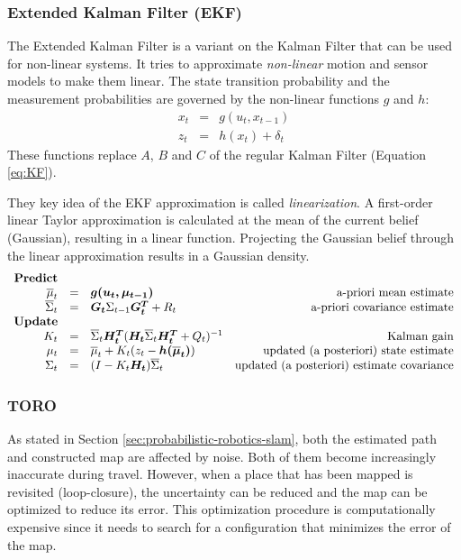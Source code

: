 \subsubsection{Extended Kalman Filter (EKF)}
\label{sec:prob-rob-ekf}
The Extended Kalman Filter is a variant on the Kalman Filter that can be used for non-linear systems.
It tries to approximate \textit{non-linear} motion and sensor models to make them linear.
The state transition probability and the measurement probabilities are governed by the non-linear functions $g$ and $h$:
\begin{equation}
\begin{array}{rcl}
x_t & = & g(u_t, x_{t-1}) \\
z_t & = & h(x_t) + \delta_t
\end{array}
\end{equation}
These functions replace $A$, $B$ and $C$ of the regular Kalman Filter (Equation \ref{eq:KF}).

They key idea of the EKF approximation is called \textit{linearization}.
A first-order linear Taylor approximation is calculated at the mean of the current belief (Gaussian), resulting in a linear function.
Projecting the Gaussian belief through the linear approximation results in a Gaussian density.
\begin{equation}
\begin{array}{rclr}
\text{\textbf{Predict}} \\
\overline{\mu}_t & = & \boldsymbol{g(u_t, \mu_{t-1})} & \text{a-priori mean estimate} \\
\overline{\Sigma}_t & = & \boldsymbol{G_t} \Sigma_{t-1} \boldsymbol{G_t^T} + R_t  & \text{a-priori covariance estimate} \\
\text{\textbf{Update}} \\
K_t & = & \overline{\Sigma}_t \boldsymbol{H_t^T} (\boldsymbol{H_t} \overline{\Sigma}_t \boldsymbol{H_t^T} + Q_t)^{-1} & \text{Kalman gain} \\
\mu_t & = & \overline{\mu}_t + K_t(z_t - \boldsymbol{h(\overline{\mu}_t)}) & \text{updated (a posteriori) state estimate} \\
\Sigma_t & = & (I - K_t \boldsymbol{H_t}) \overline{\Sigma}_t & \text{updated (a posteriori) estimate covariance}
\end{array}
\end{equation}



\subsubsection{TORO}
\label{sec:prob-rob-toro}
As stated in Section \ref{sec:probabilistic-robotics-slam}, both the estimated path and constructed map are affected by noise.
Both of them become increasingly inaccurate during travel.
However, when a place that has been mapped is revisited (loop-closure), the uncertainty can be reduced and the map can be optimized to reduce its error.
This optimization procedure is computationally expensive since it needs to search for a configuration that minimizes the error of the map.

